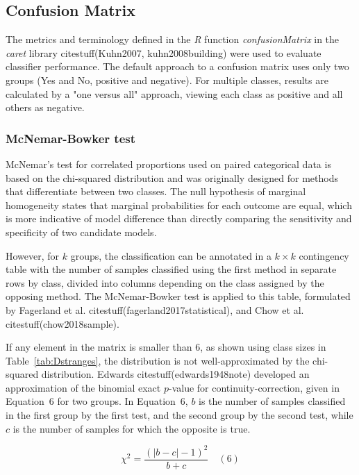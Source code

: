 \let\LaTeXcline\cline\documentclass[sn-mathphys-num]{sn-jnl}\let\cline\LaTeXcline
\begin{document}
\subsection{Confusion Matrix}

The metrics and terminology defined in the \textit{R} function \textit{confusionMatrix} in the \textit{caret} library citestuff(Kuhn2007, kuhn2008building) were used to evaluate classifier performance. The default approach to a confusion matrix uses only two groups (Yes and No, positive and negative). For multiple classes, results are calculated by a "one versus all" approach, viewing each class as positive and all others as negative.

\subsubsection{McNemar-Bowker test}

McNemar’s test for correlated proportions used on paired categorical data is based on the chi-squared distribution and was originally designed for methods that differentiate between two classes. The null hypothesis of marginal homogeneity states that marginal probabilities for each outcome are equal, which is more indicative of model difference than directly comparing the sensitivity and specificity of two candidate models.

However, for $k$ groups, the classification can be annotated
in a $k \times k$ contingency table with the number of samples classified using the first method in separate rows by class, divided into columns depending on the class assigned by the opposing method. The McNemar-Bowker test is applied to this table, formulated by Fagerland et al. citestuff(fagerland2017statistical), and Chow et al. citestuff(chow2018sample).

If any element in the matrix is smaller than $6$, as shown using class sizes in Table~\ref{tab:Dstranges}, the distribution is not well-approximated by the chi-squared distribution. Edwards citestuff(edwards1948note) developed an approximation of the binomial exact $p$-value for continuity-correction, given in Equation~6 for two groups. In Equation~6, $b$ is the number of samples classified in the first group by the first test, and the second group by the second test, while $c$ is the number of samples for which the opposite is true.
 
\begin{equation}
	\chi^{2}=\frac{(|b-c|-1)^{2}}{b+c}
	\quad\left(6\right)
\end{equation}
\end{document}

